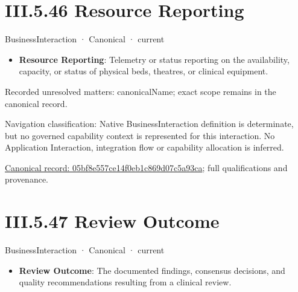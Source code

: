 \section*{III.5.46 Resource Reporting}
\label{navigation:III.5.46}

\label{element:05bf8e557ce14f0eb1c869d07c5a93ca}
{\small BusinessInteraction · Canonical · current}\par

\begin{itemize}


\item \textbf{Resource Reporting}: Telemetry or status reporting on the availability, capacity, or status of physical beds, theatres, or clinical equipment.

\end{itemize}

{\small Recorded unresolved matters: canonicalName; exact scope remains in the canonical record.}\par
{\small Navigation classification: Native BusinessInteraction definition is determinate, but no governed capability context is represented for this interaction. No Application Interaction, integration flow or capability allocation is inferred.}\par
{\footnotesize \href{../../../../../../../continuum/business/business-interaction/05bf8e557ce14f0eb1c869d07c5a93ca.md}{Canonical record: 05bf8e557ce14f0eb1c869d07c5a93ca}; full qualifications and provenance.}\par
\section*{III.5.47 Review Outcome}
\label{navigation:III.5.47}

\label{element:45bf28eb44e64554b568db48a30ac43c}
{\small BusinessInteraction · Canonical · current}\par

\begin{itemize}


\item \textbf{Review Outcome}: The documented findings, consensus decisions, and quality recommendations resulting from a clinical review.

\end{itemize}


